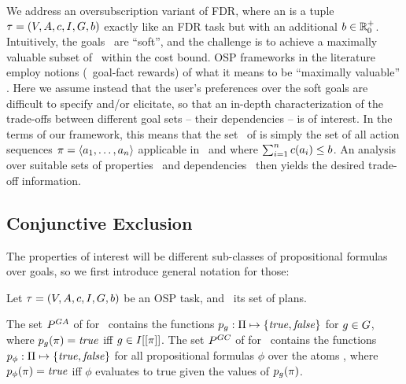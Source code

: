 We address an oversubscription variant of FDR, where an
 is a tuple $\tau =
(V,\allowbreak A,\allowbreak{\ensuremath{c}},\allowbreak I,\allowbreak G,\allowbreak{\ensuremath{b}})$
exactly like an FDR task but with an additional 
${b} \in {\mathbb{R}}^+_0$. Intuitively, the goals \goal\ are
``soft'', and the challenge is to achieve a maximally valuable subset
of \goal\ within the cost bound. OSP frameworks in the literature
employ notions (\eg\ goal-fact rewards) of what it means to be
``maximally valuable''
\cite{smith:icaps-04,domshlak:mirkis:jair-15}. Here we assume instead
that the user's preferences over the soft goals are difficult to
specify and/or elicitate, so that an in-depth characterization of the
trade-offs between different goal sets -- their dependencies -- is of
interest. In the terms of our framework, this means that the set
\plans\ of  is simply the set of all action sequences
$\pi = \langle a_1, \dots, a_n\rangle$ applicable in \init\ and
where $\sum_{i=1}^n {c}(a_i) \leq {\ensuremath{b}}$. An analysis over
suitable sets of properties \props\ and dependencies \deps\ then
yields the desired trade-off information.






\subsection{Conjunctive Exclusion}
\label{goaldep:conjunctive}

The properties of interest will be different sub-classes of
propositional formulas over goals, so we first introduce general
notation for those:

\begin{definition}
Let $\tau =
(V,\allowbreak A,\allowbreak{\ensuremath{c}},\allowbreak I,\allowbreak G,\allowbreak{\ensuremath{b}})$
be an OSP task, and \plans\ its set of plans. 

The set $P^{GA}$ of  for
\task\ contains the functions $p_g : \Pi \mapsto \{\mathit{true},
\mathit{false}\}$ for $g \in G$, where $p_g(\pi) = \mathit{true}$ iff $g \in
I[[\pi]]$.
%
The set $P^{GC}$ of  for
\task\ contains the functions $p_\phi : \Pi \mapsto \{\mathit{true},
\mathit{false}\}$ for all propositional formulas $\phi$ over the atoms \goal,
where $p_\phi(\pi) = \mathit{true}$ iff $\phi$ evaluates to true given
the values of $p_g(\pi)$.
\end{definition}

